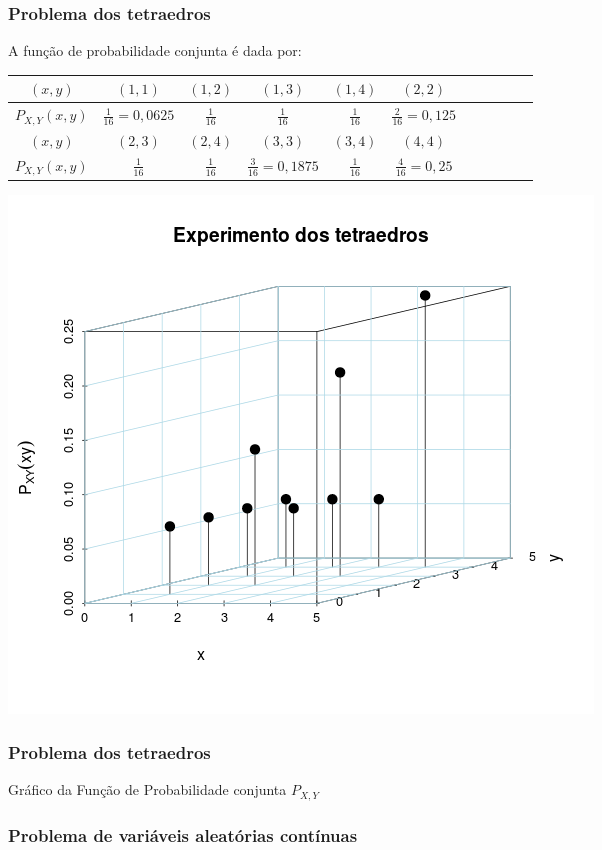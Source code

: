 \documentclass{beamer}
\theoremstyle{plain}
\begin{document}
\begin{frame}
	\frametitle{Problema dos tetraedros}
	A função de probabilidade conjunta é dada por:
	\begin{center}
		\tiny
		\begin{tabular}{|c|c|c|c|c|c|c|c|c|c|c|}
			\hline
			$(x,y)$ & $(1, 1)$ & $(1,2)$ & $(1,3)$ & $(1,4)$ & $(2,2)$ \\
			\hline
			$P_{X, Y}(x,y)$ & $\frac{1}{16} = 0,0625$ &  $\frac{1}{16}$ & $\frac{1}{16}$ & $\frac{1}{16}$ & 
			$\frac{2}{16} = 0,125$ \\
			\hline
			\hline
			$(x,y)$ & $(2,3)$ & $(2,4)$ & $(3,3)$ & $(3,4)$ & $(4,4)$\\
			\hline
			$P_{X, Y}(x,y)$ & $\frac{1}{16}$ & $\frac{1}{16}$ & $\frac{3}{16} = 0,1875$ & $\frac{1}{16}$ & $\frac{4}{16} = 0,25$\\
			\hline
		\end{tabular}
		
		\begin{center}
			\includegraphics[scale = 0.3]{exptetraedros}
			
		\end{center}
	\end{center}
\end{frame}

\begin{frame}
	\frametitle{Problema dos tetraedros}
	Gráfico da Função de Probabilidade conjunta $P_{X, Y}$
	 \begin{center}
	 \end{center}
\end{frame}

\begin{frame}
	\frametitle{Problema de variáveis aleatórias contínuas}
      \begin{center}
      \begin{center}
      \end{center}
       \end{center}
\end{frame}
\end{document}
